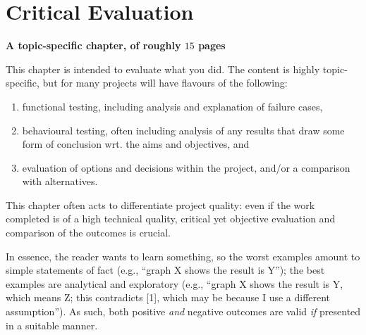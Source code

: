 \chapter{Critical Evaluation}
\label{chap:evaluation}

{\bf A topic-specific chapter, of roughly $15$ pages}
\vspace{1cm}

\noindent
This chapter is intended to evaluate what you did.  The content is highly
topic-specific, but for many projects will have flavours of the following:

\begin{enumerate}
\item functional  testing, including analysis and explanation of failure cases,
\item behavioural testing, often including analysis of any results that draw
      some form of conclusion wrt. the aims and objectives, and
\item evaluation of options and decisions within the project, and/or a
      comparison with alternatives.
\end{enumerate}

\noindent This chapter often acts to differentiate project quality: even if the
work completed is of a high technical quality, critical yet objective evaluation
and comparison of the outcomes is crucial.

In essence, the reader wants to learn something, so the worst examples amount to
simple statements of fact  (e.g., ``graph X shows the result is Y''); the best
examples are analytical  and exploratory (e.g., ``graph X shows the result is Y,
which means Z; this contradicts [1], which may be because I use a different
assumption'').  As such, both positive {\em and} negative outcomes are valid
{\em if} presented  in a suitable manner.
